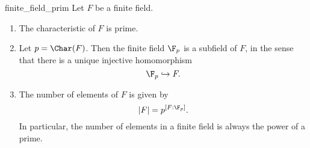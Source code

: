 \documentclass[math1530-lecture-notes]{subfiles}
\begin{document}
\begin{proposition}[]{finite_field_prim}
  Let $F$ be a finite field.
  \begin{enumerate}
    \item The characteristic of $F$ is prime.
    \item Let $p=\Char(F)$. Then the finite field $\F_p$ is a subfield of $F$, in the sense that
      there is a unique injective homomorphism \[
        \F_p\hookrightarrow F
      .\] 
    \item The number of elements of $F$ is given by \[
        \left| F \right| = p^{\left[F : \F_p\right]}
    .\] In particular, the number of elements in a finite field is always the power of a prime.
  \end{enumerate}
\end{proposition}
\end{document}
